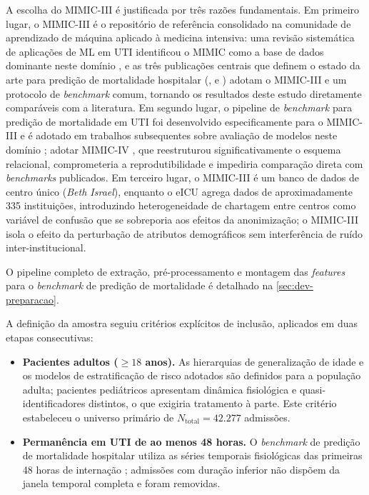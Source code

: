 A escolha do MIMIC-III é justificada por três razões fundamentais. Em primeiro lugar, o MIMIC-III é o repositório de referência consolidado na comunidade de aprendizado de máquina aplicado à medicina intensiva: uma revisão sistemática de aplicações de ML em UTI identificou o MIMIC como a base de dados dominante neste domínio \cite{Syed2021}, e as três publicações centrais que definem o estado da arte para predição de mortalidade hospitalar (,  e ) adotam o MIMIC-III e um protocolo de \textit{benchmark} comum, tornando os resultados deste estudo diretamente comparáveis com a literatura. Em segundo lugar, o pipeline de \textit{benchmark} para predição de mortalidade em UTI foi desenvolvido especificamente para o MIMIC-III \cite{Harutyunyan2019} e é adotado em trabalhos subsequentes sobre avaliação de modelos neste domínio \cite{Ma2020, Roosli2022}; adotar MIMIC-IV \cite{Johnson2020}, que reestruturou significativamente o esquema relacional, comprometeria a reprodutibilidade e impediria comparação direta com \textit{benchmarks} publicados. Em terceiro lugar, o MIMIC-III é um banco de dados de centro único (\textit{Beth Israel}), enquanto o eICU \cite{Pollard2018} agrega dados de aproximadamente 335 instituições, introduzindo heterogeneidade de chartagem entre centros como variável de confusão que se sobreporia aos efeitos da anonimização; o MIMIC-III isola o efeito da perturbação de atributos demográficos sem interferência de ruído inter-institucional.

O pipeline completo de extração, pré-processamento e montagem das \textit{features} para o \textit{benchmark} de predição de mortalidade é detalhado na \autoref{sec:dev-preparacao}.

A definição da amostra seguiu critérios explícitos de inclusão, aplicados em duas etapas consecutivas:

\begin{itemize}
    \item \textbf{Pacientes adultos ($\geq 18$ anos).} As hierarquias de generalização de idade e os modelos de estratificação de risco adotados são definidos para a população adulta; pacientes pediátricos apresentam dinâmica fisiológica e quasi-identificadores distintos, o que exigiria tratamento à parte. Este critério estabeleceu o universo primário de $N_{\text{total}} = 42.277$ admissões.
    \item \textbf{Permanência em UTI de ao menos 48 horas.} O \textit{benchmark} de predição de mortalidade hospitalar utiliza as séries temporais fisiológicas das primeiras 48 horas de internação \cite{Harutyunyan2019}; admissões com duração inferior não dispõem da janela temporal completa e foram removidas.
\end{itemize}


